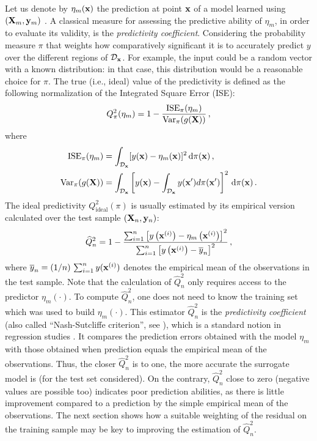 Let us denote by $\eta_m({\bf x})$ the prediction at point ${\bf x}$ of a model learned using $({\bf X}_m,{\bf y}_m)$ \citep{tibshirani_2009}. 
A classical measure for assessing the predictive ability of $\eta_m$, in order to evaluate its validity, is the \textit{predictivity coefficient}. 
Considering the probability measure $\pi$ that weights how comparatively significant it is to accurately predict $y$ over the different regions of $\mathcal{D}_{\bf x}$. 
For example, the input could be a random vector with a known distribution: in that case, this distribution would be a reasonable choice for $\pi$. 
The true (i.e., ideal) value of the predictivity is defined as the following normalization of the Integrated Square Error (ISE): 
\begin{equation}\label{eq:Q2th}
Q_\pi^2(\eta_m) = 1 - \frac{\mathrm{ISE}_\pi(\eta_m)}{\operatorname{Var}_\pi(g({\bf X}))} \,, 
\end{equation}
where
\begin{align*}
  \mathrm{ISE}_\pi(\eta_m) &= \int_{\mathcal{D}_{\bf x}} [y({\bf x})-\eta_m({\bf x})]^2 \, \mathrm{d}\pi({\bf x}) \,, \\
  \operatorname{Var}_\pi(g({\bf X})) &= \int_{\mathcal{D}_{\bf x}} \left[y({\bf x})-\int_{\mathcal{D}_{\bf x}} y({\bf x}') d\pi({\bf x}') \right]^2 \, \mathrm{d}\pi({\bf x})\,.
\end{align*}
The ideal predictivity $Q_{\mathrm{ideal}}^2(\pi)$ is usually estimated by its empirical version calculated over the test sample $({\bf X}_n,{\bf y}_n)$:%
\begin{equation}\label{eq:Q2test}
\widehat Q^2_n = 1 - \frac{ \sum_{i=1}^n \left[ y\left({\bf x}^{(i)}\right)-\eta_m\left({\bf x}^{(i)}\right)\right]^2}{\sum_{i=1}^n \left[y\left({\bf x}^{(i)}\right)-\overline{y}_n\right]^2}\,,
\end{equation}
where $\overline{y}_n=(1/n)\,\sum_{i=1}^n y({\bf x}^{(i)})$ denotes the empirical mean of the observations in the test sample. 
Note that the calculation of $\widehat Q^2_n$ only requires access to the predictor $\eta_m(\cdot)$. 
To compute $\widehat Q^2_n$, one does not need to know the training set which was used to build $\eta_m(\cdot)$. 
This estimator $\widehat Q^2_n$ is the \textit{predictivity coefficient} (also called ``Nash-Sutcliffe criterion'', see \citealp{NashS70}), which is a standard notion in regression studies \citep{klesar00,ioobou10}. 
It compares the prediction errors obtained with the model $\eta_m$ with those obtained when prediction equals the empirical mean of the observations. 
Thus, the closer $\widehat Q^2_n$ is to one, the more accurate the surrogate model is (for the test set considered). 
On the contrary, $\widehat Q^2_n$ close to zero (negative values are possible too) indicates poor prediction abilities, as there is little improvement compared to a prediction by the simple empirical mean of the observations. 
The next section shows how a suitable weighting of the residual on the training sample may be key to improving the estimation of $\widehat Q^2_n$. 

